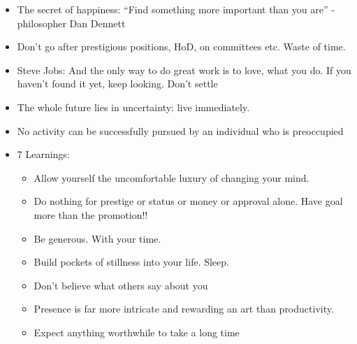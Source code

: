 \begin{itemize}
	\begin{itemize}[noitemsep,nolistsep]
	\item  The secret of happiness: ``Find something more important than you are'' - philosopher Dan Dennett
	\item Don't go after prestigious positions, HoD, on committees etc. Waste of time.
	\item Steve Jobs:  And the only way to do great work is to love, what you do. If you haven't found it yet, keep looking. Don't settle
	\item The whole future lies in uncertainty: live immediately.
	\item No activity can be successfully pursued by an individual who is preoccupied 
	\item 7 Learnings:
		\begin{itemize}[noitemsep,nolistsep]
		\item Allow yourself the uncomfortable luxury of changing your mind.
		\item Do nothing for prestige or status or money or approval alone. Have goal more than the promotion!!
		\item Be generous. With your time.
		\item Build pockets of stillness into your life. Sleep.
		\item Don't believe what others say about you
		\item Presence is far more intricate and rewarding an art than productivity.
		\item Expect anything worthwhile to take a long time
		\end{itemize}
	\end{itemize}
\end{itemize}
